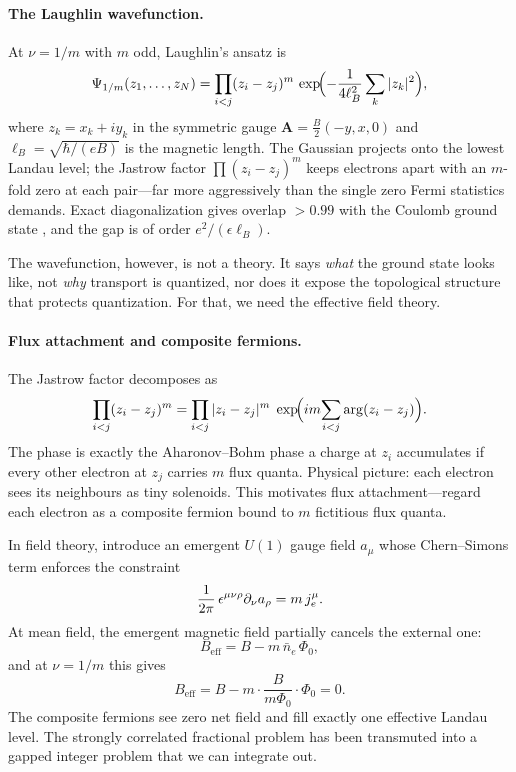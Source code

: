 \paragraph{The Laughlin wavefunction.}
At $\nu = 1/m$ with $m$ odd, Laughlin's ansatz \cite{Laughlin1983AnomalousQHE} is
\begin{equation}
  \Psi_{1/m}(z_1,\ldots,z_N)
  =
  \prod_{i<j}(z_i - z_j)^m\,
  \exp\!\Bigl(-\frac{1}{4\ell_B^2}\sum_k |z_k|^2\Bigr),
  \label{eq:laughlin-wavefunction}
\end{equation}
where $z_k = x_k + iy_k$ in the symmetric gauge $\mathbf{A} = \frac{B}{2}(-y,x,0)$ and $\ell_B = \sqrt{\hbar/(eB)}$ is the magnetic length. The Gaussian projects onto the lowest Landau level; the Jastrow factor $\prod(z_i-z_j)^m$ keeps electrons apart with an $m$-fold zero at each pair---far more aggressively than the single zero Fermi statistics demands. Exact diagonalization gives overlap $>0.99$ with the Coulomb ground state \cite{Laughlin1983AnomalousQHE,TongQuantumHallLectures}, and the gap is of order $e^2/(\epsilon\ell_B)$.

The wavefunction, however, is not a theory. It says \emph{what} the ground state looks like, not \emph{why} transport is quantized, nor does it expose the topological structure that protects quantization. For that, we need the effective field theory.

\paragraph{Flux attachment and composite fermions.}
The Jastrow factor decomposes as \cite{ZhangHanssonKivelson1989FQHE}
\begin{equation}
  \prod_{i<j}(z_i - z_j)^m
  =
  \prod_{i<j}|z_i - z_j|^m\;
  \exp\!\Bigl(im\!\sum_{i<j}\arg(z_i - z_j)\Bigr).
  \label{eq:jastrow-decomposition}
\end{equation}
The phase is exactly the Aharonov--Bohm phase a charge at $z_i$ accumulates if every other electron at $z_j$ carries $m$ flux quanta. Physical picture: each electron sees its neighbours as tiny solenoids. This motivates flux attachment---regard each electron as a composite fermion bound to $m$ fictitious flux quanta.

In field theory, introduce an emergent $U(1)$ gauge field $a_\mu$ whose Chern--Simons term enforces the constraint
\begin{equation}
  \frac{1}{2\pi}\,\epsilon^{\mu\nu\rho}\partial_\nu a_\rho
  =
  m\,j^\mu_e.
  \label{eq:flux-attachment-constraint}
\end{equation}
At mean field, the emergent magnetic field partially cancels the external one:
\begin{equation}
  B_{\mathrm{eff}} = B - m\,\bar{n}_e\,\Phi_0,
  \label{eq:effective-field}
\end{equation}
and at $\nu = 1/m$ this gives
\begin{equation}
  B_{\mathrm{eff}} = B - m\cdot\frac{B}{m\Phi_0}\cdot\Phi_0 = 0.
  \label{eq:beff-zero}
\end{equation}
The composite fermions see zero net field and fill exactly one effective Landau level. The strongly correlated fractional problem has been transmuted into a gapped integer problem that we can integrate out.

